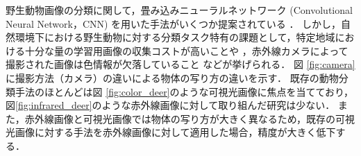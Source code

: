\documentclass[a4paper,11pt,nomag]{jsreport}
\begin{document}
野生動物画像の分類に関して，畳み込みニューラルネットワーク (Convolutional Neural Network，CNN) を用いた手法がいくつか提案されている \cite{manna2023,mohanty2022, agarwal2023, neeli2023}．
しかし，自然環境下における野生動物に対する分類タスク特有の課題として，特定地域における十分な量の学習用画像の収集コストが高いことや \cite{schneider2020}，赤外線カメラによって撮影された画像は色情報が欠落していること \cite{kishimoto2023}などが挙げられる．
図 \ref{fig:camera}に撮影方法（カメラ）の違いによる物体の写り方の違いを示す．
既存の動物分類手法のほとんどは図 \ref{fig:color_deer}のような可視光画像に焦点を当てており，図\ref{fig:infrared_deer}のような赤外線画像に対して取り組んだ研究は少ない．
また，赤外線画像と可視光画像では物体の写り方が大きく異なるため，既存の可視光画像に対する手法を赤外線画像に対して適用した場合，精度が大きく低下する．
\end{document}
